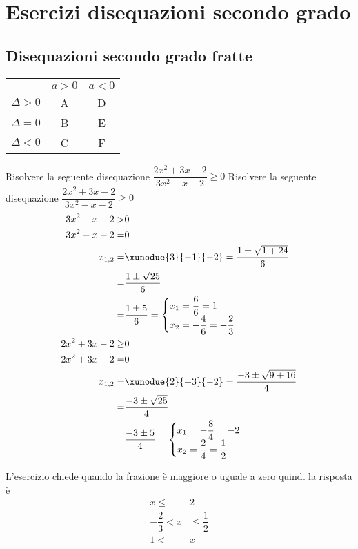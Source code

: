 \tcbstartrecording
\chapter{Esercizi disequazioni secondo grado}
\section{Disequazioni secondo grado fratte}
{\centering \begin{tabular}{ccc}
\toprule
	& $a>0$ &  $a<0$\\ 
	\midrule
$\Delta >0$	& A  & D \\ 
$\Delta=0$	& B & E \\ 
$\Delta<0$	& C &  F\\ 
\bottomrule
\end{tabular}\par }
\begin{exercise}
	Risolvere la seguente disequazione $\dfrac{2x^2+3x-2}{3x^2-x-2}\geq 0$
\tcblower
	Risolvere la seguente disequazione $\dfrac{2x^2+3x-2}{3x^2-x-2}\geq 0$
\begin{align*}
3x^2-x-2>&0\\
3x^2-x-2=&0\\
x_{1,2}=&\xunodue{3}{-1}{-2}=\dfrac{1\pm\sqrt{1+24}}{6}\\
=&\dfrac{1\pm\sqrt{25}}{6}\\
=&\dfrac{1\pm 5}{6}=\begin{cases}
x_1=\dfrac{6}{6}=1\\
x_2=-\dfrac{4}{6}=-\dfrac{2}{3}
\end{cases}\\
2x^2+3x-2\geq&0\\
2x^2+3x-2=&0\\
x_{1,2}=&\xunodue{2}{+3}{-2}=\dfrac{-3\pm\sqrt{9+16}}{4}\\
=&\dfrac{-3\pm\sqrt{25}}{4}\\
=&\dfrac{-3\pm 5}{4}=\begin{cases}
x_1=-\dfrac{8}{4}=-2\\
x_2=\dfrac{2}{4}=\dfrac{1}{2}
\end{cases}\\
\end{align*}
\begin{center}
	
\end{center}
L'esercizio chiede quando la frazione è maggiore o uguale a zero quindi la risposta è 
\begin{align*}
x\leq& 2\\ -\dfrac{2}{3}<x&\leq \dfrac{1}{2}\\ 1<&x\\
\end{align*}
\end{exercise}
